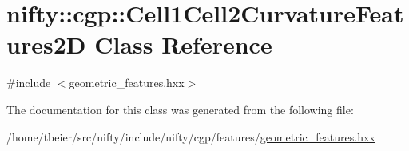 \hypertarget{classnifty_1_1cgp_1_1Cell1Cell2CurvatureFeatures2D}{}\section{nifty\+:\+:cgp\+:\+:Cell1\+Cell2\+Curvature\+Features2\+D Class Reference}
\label{classnifty_1_1cgp_1_1Cell1Cell2CurvatureFeatures2D}


{\ttfamily \#include $<$geometric\+\_\+features.\+hxx$>$}



The documentation for this class was generated from the following file\+:\begin{DoxyCompactItemize}
\item 
/home/tbeier/src/nifty/include/nifty/cgp/features/\hyperlink{geometric__features_8hxx}{geometric\+\_\+features.\+hxx}\end{DoxyCompactItemize}
